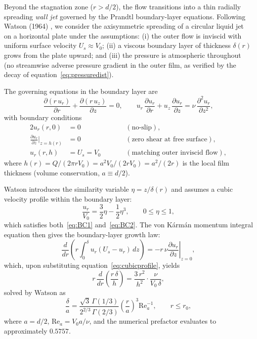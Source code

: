\documentclass[aps,prfluids,reprint,amsmath,amssymb,floatfix]{revtex4-2}
\newcommand{\Rey}{\mathrm{Re}}
\begin{document}
Beyond the stagnation zone ($r > d/2$), the flow transitions into a thin
radially spreading \emph{wall jet} governed by the Prandtl boundary-layer
equations. Following Watson (1964) \citep{Watson1964}, we consider the
axisymmetric spreading of a circular liquid jet on a horizontal plate under
the assumptions: (i) the outer flow is inviscid with uniform surface velocity
$U_s \approx V_0$; (ii) a viscous boundary layer of thickness $\delta(r)$
grows from the plate upward; and (iii) the pressure is atmospheric throughout
(no streamwise adverse pressure gradient in the outer film, as verified
by the decay of equation~\ref{eq:pressuredist}).

The governing equations in the boundary layer are
\begin{equation}
    \frac{\partial(r\,u_r)}{\partial r} + \frac{\partial(r\,u_z)}{\partial z}
    = 0,
    \qquad
    u_r\,\frac{\partial u_r}{\partial r} + u_z\,\frac{\partial u_r}{\partial z}
    = \nu\,\frac{\partial^2 u_r}{\partial z^2},
    \label{eq:BLeqs}
\end{equation}
with boundary conditions
\begin{alignat}{2}
    u_r(r,0) &= 0 &&\qquad (\text{no-slip}),\label{eq:BC1}\\
    \frac{\partial u_r}{\partial z}\bigg|_{z=h(r)} &= 0 &&\qquad
    (\text{zero shear at free surface}),\label{eq:BC2}\\
    u_r(r,h) &= U_s = V_0 &&\qquad (\text{matching outer inviscid flow}),
    \label{eq:BC3}
\end{alignat}
where $h(r) = Q/(2\pi r V_0) = a^2 V_0/(2r V_0) = a^2/(2r)$
is the local film thickness (volume conservation, $a \equiv d/2$).

Watson introduces the similarity variable $\eta = z/\delta(r)$ and assumes
a cubic velocity profile within the boundary layer:
\begin{equation}
    \frac{u_r}{V_0} = \frac{3}{2}\eta - \frac{1}{2}\eta^3,
    \qquad 0 \leq \eta \leq 1,
    \label{eq:cubicprofile}
\end{equation}
which satisfies both~\eqref{eq:BC1} and~\eqref{eq:BC2}. The von K\'{a}rm\'{a}n
momentum integral equation then gives the boundary-layer growth law:
\begin{equation}
    \frac{d}{dr}\!\left(r\int_0^\delta u_r(U_s - u_r)\,dz\right) = -r\,\nu
    \left.\frac{\partial u_r}{\partial z}\right|_{z=0},
\end{equation}
which, upon substituting equation~\eqref{eq:cubicprofile}, yields
\begin{equation}
    r\,\frac{d}{dr}\!\left(\frac{r\,\delta}{h}\right)
    = \frac{3\,r^2}{h^2}\cdot\frac{\nu}{V_0\,\delta},
    \label{eq:karman}
\end{equation}
solved by Watson as
\begin{equation}
    \frac{\delta}{a} = \frac{\sqrt{3}\,\Gamma(1/3)}{2^{2/3}\,\Gamma(2/3)}
    \left(\frac{r}{a}\right)^3 \Rey_a^{-1},
    \qquad r \leq r_0,
    \label{eq:deltawatson}
\end{equation}
where $a = d/2$, $\Rey_a = V_0 a/\nu$, and the numerical prefactor
evaluates to approximately $0.5757$.
\end{document}
